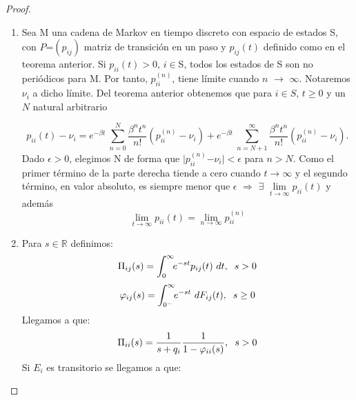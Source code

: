 \documentclass[12pt,a4paper]{article}
\begin{document}
     \begin{proof}
         	\begin{enumerate}
     	
     \item Sea M una cadena de Markov en tiempo discreto con espacio de estados S, con $P$=$(p_{ij})$ matriz de transición en un paso y $p_{ij}(t)$ definido como en el teorema anterior. Si $p_{ii}(t)$$>$$0$, $i$$\in$S, todos los estados de S son no periódicos para M. Por tanto, $p_{ii}^{(n)}$, tiene límite cuando $n$ $\rightarrow$ $\infty$. Notaremos $\nu_{i}$ a dicho límite. Del teorema anterior obtenemos que para $i$$\in$$S$, $t$$\geq$$0$ y un $N$ natural arbitrario 
      
      \begin{equation*}
      p_{ii}(t)-\nu_{i}=e^{-\beta t}\ \sum_{n = 0}^{N}\frac{\beta^{n} t^{n}}{n!}(p_{ii}^{(n)}-\nu_{i})+e^{-\beta t}\ \sum_{n = N+1}^{\infty}\frac{\beta^{n} t^{n}}{n!}(p_{ii}^{(n)}-\nu_{i}).
      \end{equation*}
      Dado $\epsilon$$>$$0$, elegimos N de forma que $\mid$$p_{ii}^{(n)}$$-$$\nu_{i}$$\mid$$<$$\epsilon$ para $n$$>$$N$. Como el primer término de la parte derecha tiende a cero cuando $t$$\rightarrow$$\infty$ y el segundo término, en valor absoluto, es siempre menor que $\epsilon$ $\Longrightarrow$  $\exists$ $\lim\limits_{t\rightarrow \infty} p_{ii}(t)$ y además
      \begin{equation*}
      \lim\limits_{t\rightarrow \infty} p_{ii}(t)= \lim\limits_{n\rightarrow \infty} p_{ii}^{(n)}
      \end{equation*}
      \item Para $s$$\in$$\mathbb{R}$ definimos:
      \begin{equation*}
      \Pi_{ij}(s)=\int_0^\infty\!\!e^{-st}p_{ij}(t)\ dt,  \hspace{0.2cm} s>0
      \end{equation*}
      \begin{equation*}
      \varphi_{ij}(s)=\int_{0^{-}}^\infty\!\!e^{-st}\ dF_{ij}(t),  \hspace{0.2cm} s \geq 0
      \end{equation*}
      Llegamos a que:
      \begin{equation*}
      \Pi_{ii}(s)=\frac{1}{s+q_{i}}\frac{1}{1-\varphi_{ii}(s)},  \hspace{0.2cm} s>0
      \end{equation*}
      Si $E_{i}$ es transitorio se llegamos a que:
      \begin{equation*}

\end{equation*}
\end{enumerate}
\end{proof}
\end{document}
